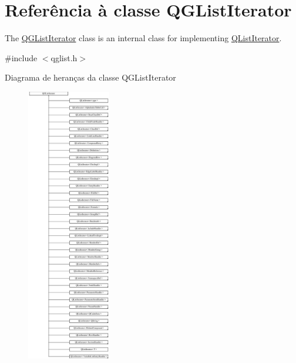 \hypertarget{class_q_g_list_iterator}{\section{Referência à classe Q\-G\-List\-Iterator}
\label{class_q_g_list_iterator}
}


The \hyperlink{class_q_g_list_iterator}{Q\-G\-List\-Iterator} class is an internal class for implementing \hyperlink{class_q_list_iterator}{Q\-List\-Iterator}.  




{\ttfamily \#include $<$qglist.\-h$>$}

Diagrama de heranças da classe Q\-G\-List\-Iterator\begin{figure}[H]
\begin{center}
\leavevmode
\includegraphics[height=12.000000cm]{class_q_g_list_iterator}
\end{center}
\end{figure}
